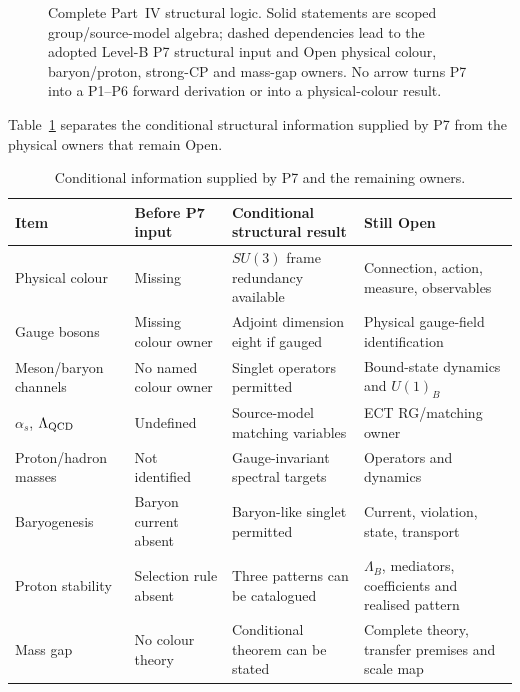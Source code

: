 \documentclass[11pt,a4paper]{article}
\begin{document}
\begin{figure}[H]
\caption{Complete Part~IV structural logic.  Solid statements are scoped
group/source-model algebra; dashed dependencies lead to the adopted Level-B
P7 structural input and Open physical colour, baryon/proton, strong-CP and
mass-gap owners.  No arrow turns P7 into a P1--P6 forward derivation or into a
physical-colour result.}
\label{fig:pop_partIV_logic}
\end{figure}

\clearpage

\clearpage

Table~\ref{tab:companion_p7_conditional_owners} separates the conditional
structural information supplied by P7 from the physical owners that remain
Open.

\begin{table}[H]
\centering
\small
\caption{Conditional information supplied by P7 and the remaining owners.}
\label{tab:companion_p7_conditional_owners}
\begin{tabular}{@{}p{3.2cm}p{3.2cm}p{3.2cm}p{3cm}@{}}
\toprule
Item & Before P7 input & Conditional structural result & Still Open \\
\midrule
Physical colour & Missing & $SU(3)$ frame redundancy available & Connection, action, measure, observables \\
Gauge bosons & Missing colour owner & Adjoint dimension eight if gauged & Physical gauge-field identification \\
Meson/baryon channels & No named colour owner & Singlet operators permitted & Bound-state dynamics and $U(1)_B$ \\
$\alpha_s$, $\Lambda_{\rm QCD}$ & Undefined & Source-model matching variables & ECT RG/matching owner \\
Proton/hadron masses & Not identified & Gauge-invariant spectral targets & Operators and dynamics \\
Baryogenesis & Baryon current absent & Baryon-like singlet permitted & Current, violation, state, transport \\
Proton stability & Selection rule absent & Three patterns can be catalogued & $\Lambda_B$, mediators, coefficients and realised pattern \\
Mass gap & No colour theory & Conditional theorem can be stated & Complete theory, transfer premises and scale map \\
\bottomrule
\end{tabular}
\end{table}
\end{document}
